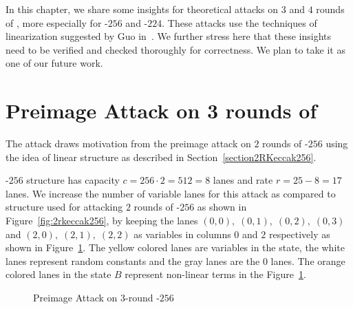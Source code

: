 In this chapter, we share some insights for theoretical attacks on $3$ and $4$ rounds of \KECCAK{}, more especially for \KECCAK-$256$ and \KECCAK-$224$. These attacks use the techniques of linearization suggested by Guo \etal in~\cite{guo2016linear}. 
We further stress here that these insights need to be verified and checked thoroughly for correctness. We plan to take it as one of our future work.

\section{Preimage Attack on 3 rounds of }
\label{3rkeccak256}
The attack draws motivation from the preimage attack on $2$ rounds of \Keccak-$256$ using the idea of linear structure as described in Section~\ref{section2RKeccak256}.

\Keccak-$256$ structure has capacity $c = 256 \cdot 2 = 512 = 8$ lanes and rate $r=25-8=17$ lanes. We increase the number of variable lanes for this attack as compared to structure used for attacking $2$ rounds of \Keccak-$256$ as shown in Figure~\ref{fig:2rkeccak256}, by keeping the lanes $(0,0),\;(0,1),\;(0,2),\; (0,3)$ and $(2,0),\; (2,1),\; (2,2)$ as variables in columns $0$ and $2$ respectively as shown in Figure~\ref{fig:3rkeccak256}. 
The yellow colored lanes are variables in the state, the white lanes represent random constants and the gray lanes are the $0$ lanes. The orange colored lanes in the state $B$ represent non-linear terms in the Figure~\ref{fig:3rkeccak256}.

\begin{figure}[H]
        \centering
        \caption{Preimage Attack on $3$-round \KECCAK-$256$}
        \label{fig:3rkeccak256}
\end{figure}

